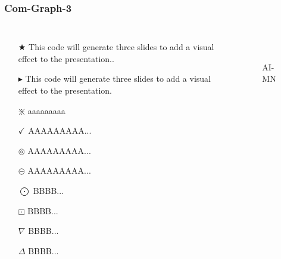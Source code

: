 \documentclass[10pt]{beamer}
\begin{document}
	\begin{frame}
		\frametitle{Com-Graph-3}
		\begin{columns}
			\begin{itemize}
				\item[$\bigstar$] This code will generate three slides to add a visual effect to the presentation..
				\item[$\blacktriangleright$] This code will generate three slides to add a visual effect to the presentation.
				\item[$\divideontimes$] aaaaaaaaa
				\item[$\checkmark$] AAAAAAAAA...
				\item[$\circledcirc$] AAAAAAAAA...
				\item[$\circleddash$] AAAAAAAAA...
				\item[$\bigodot$] BBBB...
				\item[$\boxdot$] BBBB...
				\item[$\nabla$] BBBB...
				\item[$\Delta$] BBBB...
			\end{itemize}
			
			\begin{figure}
				\centering
				 \\
				\caption{AI-MN}
			\end{figure}
		\end{columns}
	\end{frame}
\end{document}
